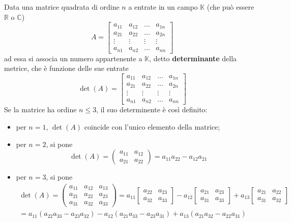 \documentclass{book}
\theoremstyle{definition}
\theoremstyle{plain}
\begin{document}
Data una matrice quadrata di ordine $n$ a entrate in un campo $\mathds{K}$ (che può
essere $\mathds{R}$ o $\mathds{C}$)
\begin{equation*}
  A=
  \begin{bmatrix}
    a_{11} & a_{12} & \dots & a_{1n}\\
    a_{21} & a_{22} & \dots & a_{2n}\\
    \vdots & \vdots & \vdots& \vdots\\
    a_{n1} & a_{n2} & \dots & a_{nn}
  \end{bmatrix}
\end{equation*}
ad essa si associa un numero appartenente a $\mathds{K}$, detto \textbf{determinante}
della metrice, che è funzione delle sue entrate
\begin{equation*}
  \det(A)=
  \begin{bmatrix}
    a_{11} & a_{12} & \dots & a_{1n}\\
    a_{21} & a_{22} & \dots & a_{2n}\\
    \vdots & \vdots & \vdots& \vdots\\
    a_{n1} & a_{n2} & \dots & a_{nn}
  \end{bmatrix}
\end{equation*}
Se la matrice ha ordine $n\leq 3$, il suo determinente è così definito:
\begin{itemize}
\item per $n=1$, $\det(A)$ coincide con l'unico elemento della matrice;
\item per $n=2$, si pone
  \begin{equation*}
    \det(A)=
    \begin{pmatrix}
      a_{11} &a_{12}\\
      a_{21} & a_{22}
    \end{pmatrix}= a_{11}a_{22}-a_{12}a_{21}
  \end{equation*}
\item per $n=3$, si pone
  \begin{eqnarray*}
    \det(A)=
    \begin{pmatrix}
      a_{11} & a_{12} & a_{13}\\
      a_{21} & a_{22} & a_{23}\\
      a_{31} & a_{32} & a_{33}
    \end{pmatrix}= a_{11}
    \begin{bmatrix}
      a_{22} & a_{23}\\
      a_{32} & a_{33}
    \end{bmatrix} - a_{12}
    \begin{bmatrix}
      a_{21} & a_{23}\\
      a_{31} & a_{33}
    \end{bmatrix}+
    a_{13}
    \begin{bmatrix}
      a_{21} & a_{22}\\
      a_{31} & a_{32}
    \end{bmatrix}\\
    = a_{11}(a_{22}a_{33}-a_{23}a_{32})-a_{12}(a_{21}a_{33}-a_{23}a_{31})+a_{13}
    (a_{21}a_{32}-a_{22}a_{31})
  \end{eqnarray*}
\end{itemize}
\end{document}
